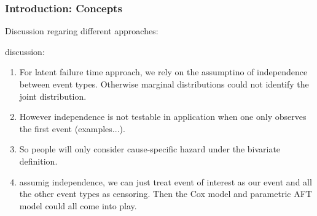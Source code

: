 \documentclass{beamer}[10]
\begin{document}
\begin{frame}
	\frametitle{Introduction: Concepts}
	Discussion regaring different approaches:
	\begin{block}{discussion:}
		\begin{enumerate}
			\item For latent failure time approach, we rely on the assumptino of independence between event types. Otherwise marginal distributions could not identify the joint distribution.
			\item However independence is not testable in application when one only observes the first event (examples...).
			\item So people will only consider cause-specific hazard under the bivariate definition.
			\item assumig independence, we can just treat event of interest as our event and all the other event types as censoring. Then the Cox model and parametric AFT model could all come into play.
		\end{enumerate}
	\end{block}
\end{frame}
\end{document}
